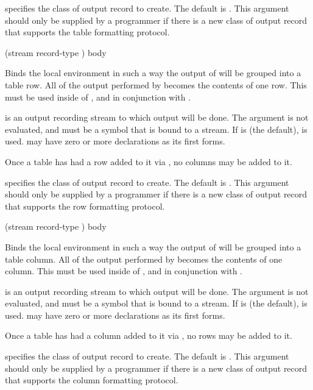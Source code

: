  specifies the class of output record to create.  The default
is .  This argument should only be supplied by
a programmer if there is a new class of output record that supports the table
formatting protocol.


 {(\optional stream \key record-type \allow)
                            \body body} 

Binds the local environment in such a way the output of  will be
grouped into a table row.  All of the output performed by  becomes the
contents of one row.  This must be used inside of , and in
conjunction with .

 is an output recording stream to which output will be done.  The
 argument is not evaluated, and must be a symbol that is bound to a
stream.  If  is  (the default),  is
used.   may have zero or more declarations as its first forms.

Once a table has had a row added to it via , no columns may
be added to it.

 specifies the class of output record to create.  The default
is .  This argument should only be supplied by a
programmer if there is a new class of output record that supports the row
formatting protocol.


 {(\optional stream \key record-type \allow)
                               \body body} 

Binds the local environment in such a way the output of  will be
grouped into a table column.  All of the output performed by  becomes
the contents of one column.  This must be used inside of ,
and in conjunction with .

 is an output recording stream to which output will be done.  The
 argument is not evaluated, and must be a symbol that is bound to a
stream.  If  is  (the default),  is
used.   may have zero or more declarations as its first forms.

Once a table has had a column added to it via , no rows
may be added to it.

 specifies the class of output record to create.  The default
is .  This argument should only be supplied
by a programmer if there is a new class of output record that supports the
column formatting protocol.


